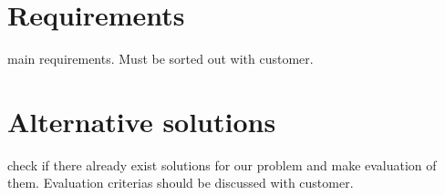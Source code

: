 \section{Requirements}
main requirements. Must be sorted out with customer.

\section{Alternative solutions}
check if there already exist solutions for our problem and make evaluation of them. Evaluation criterias should be discussed with customer. 
